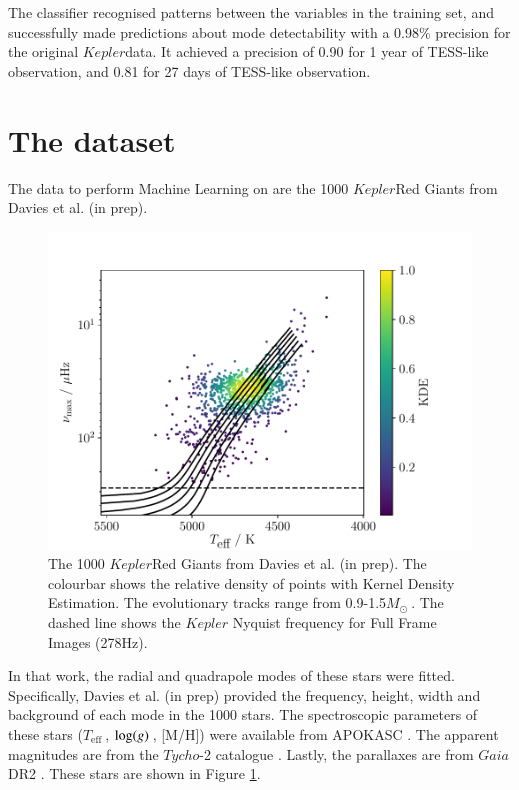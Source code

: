 \documentclass[a4paper,fleqn,usenatbib,useAMS]{mnras}
\newcommand{\teff}{\ensuremath{T_{\textrm{eff}}\:}}
\newcommand{\kep}{\ensuremath{Kepler}\:}
\newcommand{\msol}{\ensuremath{M_{\odot}\:}}
\newcommand{\logg}{\ensuremath{{\rm log}(g)\:}}
\begin{document}
The classifier recognised patterns between the variables in the training set, and successfully made predictions about mode detectability with a 0.98\% precision for the original \kep data. It achieved a precision of 0.90 for 1 year of TESS-like observation, and 0.81 for 27 days of TESS-like observation.
\fi


\section{The dataset}
\label{sect: dataset}

The data to perform Machine Learning on are the 1000 \kep Red Giants from Davies et al. (in prep).
\begin{figure}
	\centering
	\includegraphics[scale=0.5]{Plot1_HR.pdf}
	\caption{The 1000 \kep Red Giants from Davies et al. (in prep). The colourbar shows the relative density of points with Kernel Density Estimation. The evolutionary tracks range from 0.9-1.5\msol. The dashed line shows the $Kepler$ Nyquist frequency for Full Frame Images (278Hz).}	
	\label{fig:dataset}
\end{figure}
In that work, the radial and quadrapole modes of these stars were fitted. Specifically, Davies et al. (in prep) provided the frequency, height, width and background of each mode in the 1000 stars. The spectroscopic parameters of these stars (\teff, \logg, [M/H]) were available from APOKASC \citet{pinsonneault_apokasc_2014}. The apparent magnitudes are from the $Tycho$-2 catalogue \citet{hog_tycho-2_2000}. Lastly, the parallaxes are from $Gaia$ DR2 \citet{lindegren_gaia_2018}. These stars are shown in Figure \ref{fig:dataset}.
\end{document}
